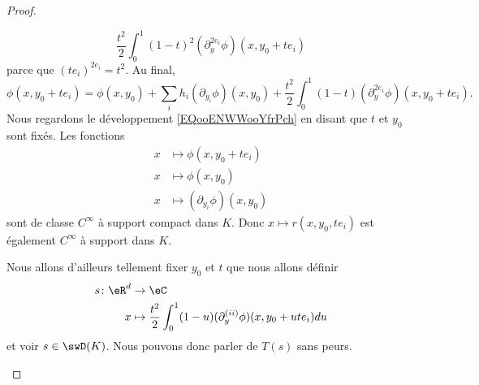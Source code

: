 \begin{proof}
\begin{subproof}
\begin{equation}
			\frac{ t^2 }{ 2 }\int_0^1(1-t)^2(\partial_y^{2e_i}\phi)(x,y_0+te_i)
		\end{equation}
		parce que \( (te_i)^{2e_i}=t^2\). Au final,
		\begin{equation}		\label{EQooENWWooYfrPch}
			\phi(x,y_0+te_i)=\phi(x,y_0)+\sum_ih_i(\partial_{y_i}\phi)(x,y_0)+\frac{ t^2 }{2}\int_0^1(1-t)(\partial_y^{2e_i}\phi)(x,y_0+te_i).
		\end{equation}
		Nous regardons le développement \eqref{EQooENWWooYfrPch} en disant que \( t\) et \( y_0\) sont fixés. Les fonctions
		\begin{subequations}
			\begin{align}
				x & \mapsto \phi(x, y_0+te_i)           \\
				x & \mapsto \phi(x, y_0)                \\
				x & \mapsto (\partial_{y_i}\phi)(x,y_0)
			\end{align}
		\end{subequations}
		sont de classe \(  C^{\infty}\) à support compact dans \( K\). Donc \( x\mapsto r(x,y_0,te_i)\) est également \(  C^{\infty}\) à support dans \( K\).

		Nous allons d'ailleurs tellement fixer \( y_0\) et \( t\) que nous allons définir
		\begin{equation}
			\begin{aligned}
				s\colon \eR^d & \to \eC                                                                       \\
				x             & \mapsto  \frac{ t^2 }{ 2 }\int_0^1(1-u)(\partial_y^{(ii)}\phi)(x,y_0+ute_i)du
			\end{aligned}
		\end{equation}
		et voir \( s\in\swD(K)\). Nous pouvons donc parler de \( T(s)\) sans peurs.


\end{subproof}
\end{proof}
